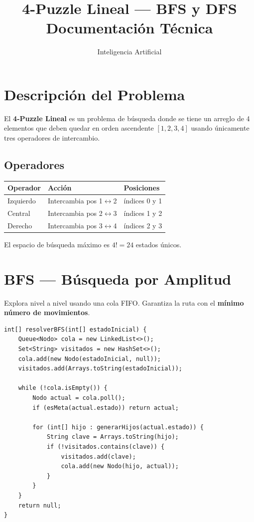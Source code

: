 \documentclass[12pt,a4paper]{article}
\title{\textbf{4-Puzzle Lineal --- BFS y DFS}\\
  \large Documentación Técnica}
\author{Inteligencia Artificial}
\date{}
\begin{document}
\maketitle
\tableofcontents
\newpage

\section{Descripción del Problema}
El \textbf{4-Puzzle Lineal} es un problema de búsqueda donde se tiene un arreglo de 4 elementos que deben quedar en orden ascendente $[1,2,3,4]$ usando únicamente tres operadores de intercambio.

\subsection{Operadores}
\begin{center}
\begin{tabular}{|l|l|l|}
\hline
\textbf{Operador} & \textbf{Acción} & \textbf{Posiciones} \\
\hline
Izquierdo & Intercambia pos 1$\leftrightarrow$2 & índices 0 y 1 \\
Central   & Intercambia pos 2$\leftrightarrow$3 & índices 1 y 2 \\
Derecho   & Intercambia pos 3$\leftrightarrow$4 & índices 2 y 3 \\
\hline
\end{tabular}
\end{center}

El espacio de búsqueda máximo es $4! = 24$ estados únicos.

\section{BFS --- Búsqueda por Amplitud}

Explora nivel a nivel usando una cola FIFO. Garantiza la ruta con el \textbf{mínimo número de movimientos}.

\begin{lstlisting}
int[] resolverBFS(int[] estadoInicial) {
    Queue<Nodo> cola = new LinkedList<>();
    Set<String> visitados = new HashSet<>();
    cola.add(new Nodo(estadoInicial, null));
    visitados.add(Arrays.toString(estadoInicial));

    while (!cola.isEmpty()) {
        Nodo actual = cola.poll();
        if (esMeta(actual.estado)) return actual;

        for (int[] hijo : generarHijos(actual.estado)) {
            String clave = Arrays.toString(hijo);
            if (!visitados.contains(clave)) {
                visitados.add(clave);
                cola.add(new Nodo(hijo, actual));
            }
        }
    }
    return null;
}
\end{lstlisting}
\end{document}
